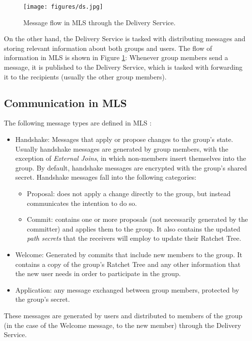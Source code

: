 \documentclass[preprint, 12pt]{elsarticle}
\begin{document}
\begin{figure}
\centering
\texttt{[image: figures/ds.jpg]}
\caption{Message flow in MLS through the Delivery Service.}
\label{fig:ds}
\end{figure}

On the other hand, the Delivery Service is tasked with distributing messages and storing relevant information about both groups and users. The flow of information in MLS is shown in Figure \ref{fig:ds}: Whenever group members send a message, it is published to the Delivery Service, which is tasked with forwarding it to the recipients (usually the other group members).  

\subsection{Communication in MLS}

The following message types are defined in MLS \cite{mls}:

\begin{itemize}
    \item Handshake: Messages that apply or propose changes to the group's state. Usually handshake messages are generated by group members, with the exception of \textit{External Joins}, in which non-members insert themselves into the group. By default, handshake messages are encrypted with the group's shared secret. Handshake messages fall into the following categories: 
    \begin{itemize}
        \item Proposal: does not apply a change directly to the group, but instead communicates the intention to do so. 
        \item Commit: contains one or more proposals (not necessarily generated by the committer) and applies them to the group. It also contains the updated \textit{path secrets} that the receivers will employ to update their Ratchet Tree. 
    \end{itemize}
    \item Welcome: Generated by commits that include new members to the group. It contains a copy of the group's Ratchet Tree and any other information that the new user needs in order to participate in the group.
    \item Application: any message exchanged between group members, protected by the group's secret.
\end{itemize} 

These messages are generated by users and distributed to members of the group (in the case of the Welcome message, to the new member) through the Delivery Service. 
\end{document}
